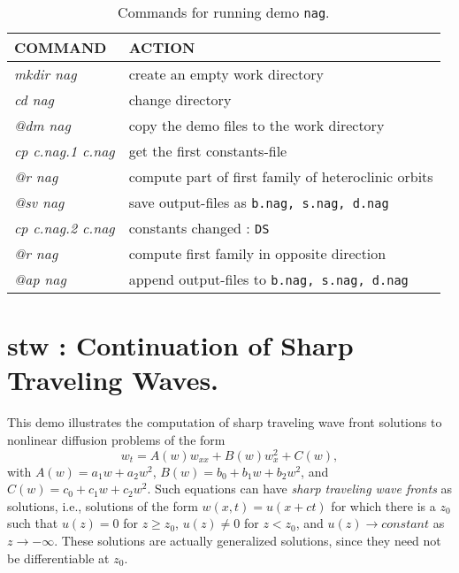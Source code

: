 \documentclass[12pt]{report}
\begin{document}
\begin{table}[htbp]
\begin{center}
\begin{tabular}{| l | l |}
\hline
  COMMAND  & ACTION \\
\hline
  {\it mkdir nag} & create an empty work directory \\ 
  {\it cd nag} & change directory \\
  {\it @dm nag} & copy the demo files to the work directory \\
\hline
  {\it cp c.nag.1 c.nag} & get the first constants-file \\ 
  {\it @r nag} & compute part of first family of heteroclinic orbits \\ 
  {\it @sv nag} & save output-files as {\tt b.nag, s.nag, d.nag} \\ 
\hline
  {\it cp c.nag.2 c.nag} & constants changed : {\tt DS} \\ 
  {\it @r nag} & compute first family in opposite direction \\ 
  {\it @ap nag} & append output-files to {\tt b.nag, s.nag, d.nag} \\ 
\hline
\end{tabular}
\caption{Commands for running demo {\tt nag}.}
\label{tbl:demo_nag}
\end{center}
\end{table}

\newpage
\section{ stw : Continuation of Sharp Traveling Waves.} \label{sec:Demos_stw}
This demo illustrates the computation of sharp traveling wave front solutions
to nonlinear diffusion problems of the form
$$ w_t = A(w) w_{xx} + B(w) w_x^{2} + C(w),  $$
with
$A(w) = a_1 w + a_2 w^{2}$,
$B(w) = b_0 + b_1 w + b_2 w^{2}$,
and
$C(w) = c_0 + c_1 w + c_2 w^{2}$.
Such equations can have {\it sharp traveling wave fronts} as solutions, i.e., solutions of the form
$w(x,t)=u(x+ct)$ for which there is a $z_0$ such that
$u(z)=0$ for $z \ge z_0$,
$u(z) \not= 0$ for $z < z_0$, and
$u(z) \rightarrow constant$ as $z \rightarrow -\infty$.
These solutions are actually generalized solutions, since they need
not be differentiable at $z_0$.
\end{document}
